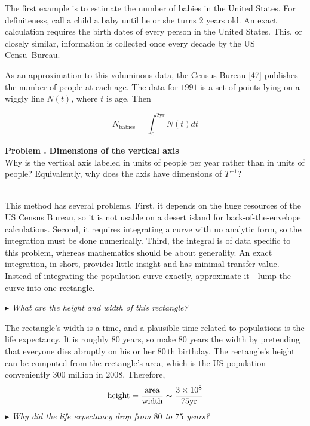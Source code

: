 \documentclass[fleqn,12 pt]{book}
\newcounter{pro1}
\newcommand{\pro}{\par\addtocounter{pro1}{1}%
\textbf{Problem \arabic{chapter}.\arabic{pro1} }\quad}
\begin{document}
\renewcommand{\headrulewidth}{0pt} 
\fancyhf{} 

\noindent
The first example is to estimate the number of babies in the United States.
For definiteness, call a child a baby until he or she turns 2 years old.
An exact calculation requires the birth dates of every person in the United States.
This, or closely similar, information is collected once every decade by the US Censu~Bureau.
\par\bigskip
\hangindent=-4.5cm\noindent{}
As an approximation to this voluminous data, the Census Bureau [47] publishes the number of people at each age.
The data for $1991$ is a set of points lying on a wiggly line $N(t)$, where $t$ is age.
Then
\begin{flushleft}
\begin{equation}
N_\text{babies}=\int^{2 \text{yr}}_0 N(t)dt
\end{equation}
\end{flushleft}
\colorbox{light-gray}{
\begin{minipage}{\textwidth}
{\footnotesize
\pro
\textbf{Dimensions of the vertical axis}\\
Why is the vertical axis labeled in units of people per year rather than in units
of people?  Equivalently, why does the axis have dimensions of $T^{-1}$?}
\end{minipage}}\\

\noindent
This method has several problems.
First, it depends on the huge resources of the US Census Bureau, so it is not usable on a desert island for back-of-the-envelope calculations.
Second, it requires integrating a curve with no analytic form, so the integration must be done numerically.
Third, the integral is of data specific to this problem, whereas mathematics should be about generality.
An exact integration, in short, provides little insight and has minimal transfer value.
Instead of integrating the population curve exactly, approximate it---lump the curve into one rectangle.\\
\begin{flushleft}
$\blacktriangleright$ \textit{What are the height and width of this rectangle?}
\end{flushleft}

\noindent
The rectangle’s width is a time, and a plausible time related to populations is the life expectancy.
It is roughly $80$ years, so make $80$ years the width by pretending that everyone dies abruptly on his or her $80$\,th birthday.
The rectangle’s height can be computed from the rectangle’s area, which
is the US population---conveniently $300$ million in $2008$.
Therefore,
\begin{equation}
\text{height}=\frac{\text{area}}{\text{width}}\thicksim\frac{3 \times 10^8}{75 \text{yr}}
\end{equation}
$\blacktriangleright$ \textit{Why did the life expectancy drop from $80$ to $75$ years?}\newpage
\end{document}
